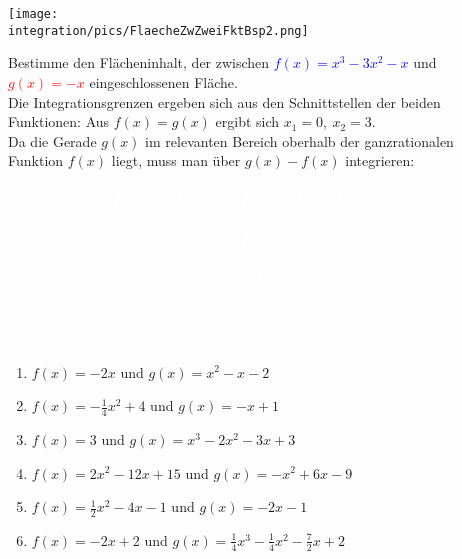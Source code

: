 \begin{minipage}{\textwidth}
	\begin{minipage}{.4\textwidth}
		\texttt{[image: \\integration/pics/FlaecheZwZweiFktBsp2.png]}
	\end{minipage}
	\begin{minipage}{.6\textwidth}\raggedright
		Bestimme den Flächeninhalt, der zwischen \textcolor{blue}{\(f(x)=x^3-3x^2-x\)} und \textcolor{red}{\(g(x)=-x\)} eingeschlossenen Fläche.\\
		\textcolor{loes}{Die Integrationsgrenzen ergeben sich aus den Schnittstellen der beiden Funktionen:}
		\textcolor{loes}{Aus \(f(x)=g(x)\) ergibt sich \(x_1=0,\ x_2=3\)}.\\
		\textcolor{loes}{Da die Gerade \(g(x)\) im relevanten Bereich oberhalb der ganzrationalen Funktion \(f(x)\) liegt, muss man über \(g(x)-f(x)\) integrieren:}
		\begin{align*}
			\textcolor{loes}{\int_{0}^3 g(x)-f(x) \td x}&\textcolor{loes}{=\int_{0}^3 -x-\left(x^3-3x^2-x\right) \td x}\\
			&\textcolor{loes}{=\int_{0}^3 -x^3+3x^2 \td x}\\
			&\textcolor{loes}{=\left[-\tfrac{1}{4}x^4+x^3\right]_{0}^3=6,75}
		\end{align*}
	\end{minipage}
\end{minipage}\vspace{\baselineskip}\\
\newpage

\begin{Exercise}[title={\raggedright\normalfont Bestimme jeweils die zwischen den beiden Funktionen eingeschlossene Fläche.}, label=flaecheZwFkt1]\\
	\begin{enumerate}[label=\alph*)]
		\item \(f(x)=-2x\) und \(g(x)=x^2-x-2\)
		\item \(f(x)=-\frac{1}{4}x^2+4\) und \(g(x)=-x+1\)
		\item \(f(x)=3\) und \(g(x)=x^3-2x^2-3x+3\)
		\item \(f(x)=2x^2-12x+15\) und \(g(x)=-x^2+6x-9\)
		\item \(f(x)=\frac{1}{2}x^2-4x-1\) und \(g(x)=-2x-1\)
		\item \(f(x)=-2x+2\) und \(g(x)=\frac{1}{4}x^3-\frac{1}{4}x^2-\frac{7}{2}x+2\)
	\end{enumerate}
\end{Exercise}

